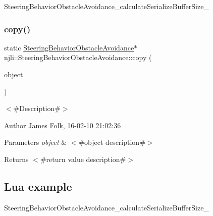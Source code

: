 \begin{DoxyCodeInclude}
\end{DoxyCodeInclude}
Steering\+Behavior\+Obstacle\+Avoidance\+\_\+calculate\+Serialize\+Buffer\+Size\+\_\+ \mbox{\label{classnjli_1_1_steering_behavior_obstacle_avoidance_a6b8a5f67dc84edfa9ebd0bbb82806155}} 
\subsubsection{\texorpdfstring{copy()}{copy()}}
{\footnotesize\ttfamily static \mbox{\hyperlink{classnjli_1_1_steering_behavior_obstacle_avoidance}{Steering\+Behavior\+Obstacle\+Avoidance}}$\ast$ njli\+::\+Steering\+Behavior\+Obstacle\+Avoidance\+::copy (\begin{DoxyParamCaption}\item[{const \mbox{\hyperlink{classnjli_1_1_steering_behavior_obstacle_avoidance}{Steering\+Behavior\+Obstacle\+Avoidance}} \&}]{object }\end{DoxyParamCaption})\hspace{0.3cm}{\ttfamily [static]}}



$<$\#\+Description\#$>$ 

\begin{DoxyAuthor}{Author}
James Folk, 16-\/02-\/10 21\+:02\+:36
\end{DoxyAuthor}

\begin{DoxyParams}{Parameters}
{\em object} & $<$\#object description\#$>$\\
\hline
\end{DoxyParams}
\begin{DoxyReturn}{Returns}
$<$\#return value description\#$>$
\end{DoxyReturn}
\hypertarget{classnjli_1_1_steering_behavior_wander_ex1}{}\subsection{Lua example}\label{classnjli_1_1_steering_behavior_wander_ex1}

\begin{DoxyCodeInclude}
\end{DoxyCodeInclude}
Steering\+Behavior\+Obstacle\+Avoidance\+\_\+calculate\+Serialize\+Buffer\+Size\+\_\+ \mbox{\label{classnjli_1_1_steering_behavior_obstacle_avoidance_a365bf7d036f2784e9b8fb9b0f2c48373}} 
